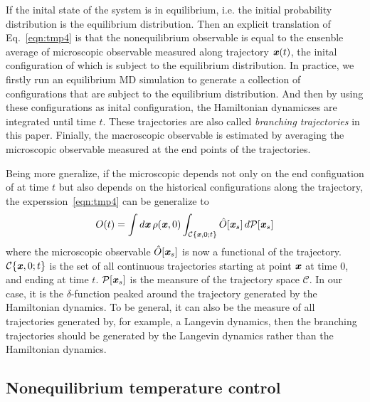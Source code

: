 \documentclass[aip,jcp,a4paper,preprint,onecolumn]{revtex4-1}
\newcommand{\vect}[1]{\textbf{\textit{#1}}}
\begin{document}
If the inital state of the system is in equilibrium, i.e. the initial
probability distribution is the equilibrium distribution. Then an
explicit translation of Eq.~\eqref{eqn:tmp4} is that the
nonequilibrium observable is equal to the ensenble average of
microscopic observable measured along trajectory $\vect x(t)$, the
inital configuration of which is subject to the equilibrium
distribution. In practice, we firstly run an equilibrium MD simulation
to generate a collection of configurations that are subject to the
equilibrium distribution. And then by using these configurations as
inital configuration, the Hamiltonian dynamicses are integrated until
time $t$. These trajectories are also called \emph{branching
  trajectories} in this paper. Finially, the macroscopic observable is
estimated by averaging the microscopic observable measured at the end
points of the trajectories.

Being more gneralize, if the microscopic depends not only on the end
configuation of at time $t$ but also depends on the historical
configurations along the trajectory, the experssion~\eqref{eqn:tmp4} can be generalize to
\begin{align}
  O(t) = \int d\vect x\,\rho(\vect x, 0) \int_{\mathcal C\{\vect x, 0; t\}} \hat O[\vect x_s] \,d\mathcal P[\vect x_s] 
\end{align}
where the microscopic observable $ \hat O[\vect x_s] $ is now a
functional of the trajectory.  $\mathcal C\{\vect x, 0; t\}$ is the
set of all continuous trajectories starting at point $\vect x$ at time
0, and ending at time $t$. $\mathcal P[\vect x_s] $ is the meansure of
the trajectory space $\mathcal C$.  In our case, it is the
$\delta$-function peaked around the trajectory generated by the
Hamiltonian dynamics. To be general, it can also be the measure of all
trajectories generated by, for example, a Langevin dynamics, then the
branching trajectories should be generated by the Langevin
dynamics rather than the Hamiltonian dynamics.


\subsection{Nonequilibrium temperature control}
\end{document}
